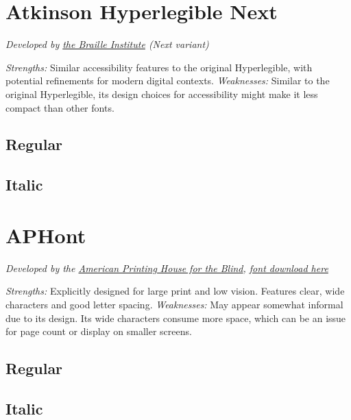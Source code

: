 \pagebreak
\section{Atkinson Hyperlegible Next}\label{troubleAtkinsonNext}
\emph{Developed by \href{https://brailleinstitute.org/freefont}{the Braille Institute} (Next variant)}
\begin{raggedright}
\emph{Strengths:} Similar accessibility features to the original Hyperlegible, with potential refinements for modern digital contexts.
\emph{Weaknesses:} Similar to the original Hyperlegible, its design choices for accessibility might make it less compact than other fonts.

\subsection{Regular}
\FontSample{\atkinsonnextfont}

\subsection{Italic}
\FontSample{{\atkinsonnextfont\itshape}}
\end{raggedright}


\pagebreak
\section{APHont}\label{trouble7}
\emph{Developed by the \href{https://www.aph.org/resources/large-print-guidelines/}{American Printing House for the Blind}, \href{https://www.aph.org/resources/large-print-guidelines/}{font download here}}
\begin{raggedright}
\emph{Strengths:} Explicitly designed for large print and low vision. Features clear, wide characters and good letter spacing.
\emph{Weaknesses:} May appear somewhat informal due to its design. Its wide characters consume more space, which can be an issue for page count or display on smaller screens.

\subsection{Regular}
\FontSample{\aphontfont}

\subsection{Italic}
\FontSample{{\aphontfont\itshape}}
\end{raggedright}


